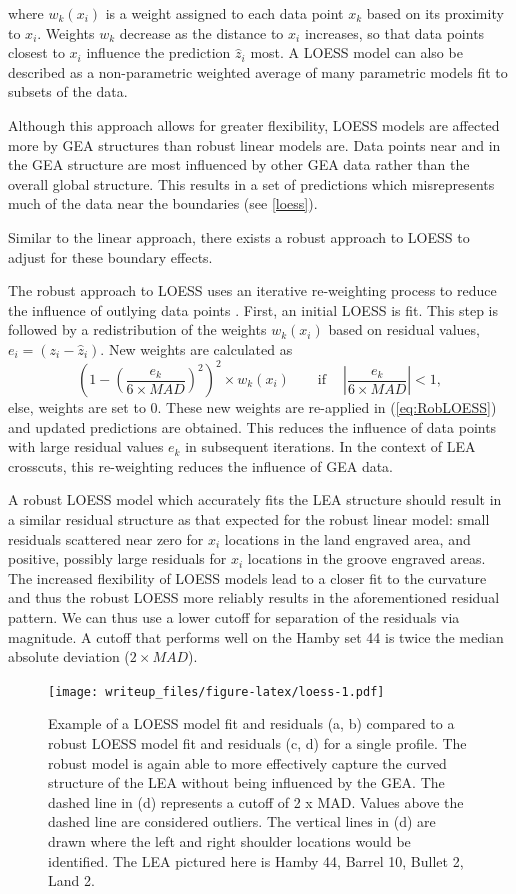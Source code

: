 \documentclass[12pt]{article}
\begin{document}
where \(w_k(x_i)\) is a weight assigned to each data point \(x_k\) based
on its proximity to \(x_i\). Weights \(w_k\) decrease as the distance to
\(x_i\) increases, so that data points closest to \(x_i\) influence the
prediction \(\widehat{z}_i\) most. A LOESS model can also be described
as a non-parametric weighted average of many parametric models fit to
subsets of the data.

Although this approach allows for greater flexibility, LOESS models are
affected more by GEA structures than robust linear models are. Data
points near and in the GEA structure are most influenced by other GEA
data rather than the overall global structure. This results in a set of
predictions which misrepresents much of the data near the boundaries
(see \autoref{loess}).

Similar to the linear approach, there exists a robust approach to LOESS
to adjust for these boundary effects.

The robust approach to LOESS uses an iterative re-weighting process to
reduce the influence of outlying data points \citep[see][]{Cleveland1}.
First, an initial LOESS is fit. This step is followed by a
redistribution of the weights \(w_k(x_i)\) based on residual values,
\(e_i = (z_i - \widehat{z}_i)\). New weights are calculated as
\[\left(1-\left(\frac{e_k}{6\times MAD}\right)^2\right)^2 \times w_k(x_i) \quad \quad \mbox{if}\quad \ \left|\frac{e_k}{6\times MAD}\right| < 1,\]
else, weights are set to 0. These new weights are re-applied in
(\ref{eq:RobLOESS}) and updated predictions are obtained. This reduces
the influence of data points with large residual values \(e_k\) in
subsequent iterations. In the context of LEA crosscuts, this
re-weighting reduces the influence of GEA data.

A robust LOESS model which accurately fits the LEA structure should
result in a similar residual structure as that expected for the robust
linear model: small residuals scattered near zero for \(x_i\) locations
in the land engraved area, and positive, possibly large residuals for
\(x_i\) locations in the groove engraved areas. The increased
flexibility of LOESS models lead to a closer fit to the curvature and
thus the robust LOESS more reliably results in the aforementioned
residual pattern. We can thus use a lower cutoff for separation of the
residuals via magnitude. A cutoff that performs well on the Hamby set 44
is twice the median absolute deviation (\(2 \times MAD\)).

\begin{figure}
\centering
\texttt{[image: writeup\_files/figure-latex/loess-1.pdf]}
\caption{\label{loess}Example of a LOESS model fit and residuals (a, b)
compared to a robust LOESS model fit and residuals (c, d) for a single
profile. The robust model is again able to more effectively capture the
curved structure of the LEA without being influenced by the GEA. The
dashed line in (d) represents a cutoff of 2 x MAD. Values above the
dashed line are considered outliers. The vertical lines in (d) are drawn
where the left and right shoulder locations would be identified. The LEA
pictured here is Hamby 44, Barrel 10, Bullet 2, Land 2.}
\end{figure}
\end{document}
